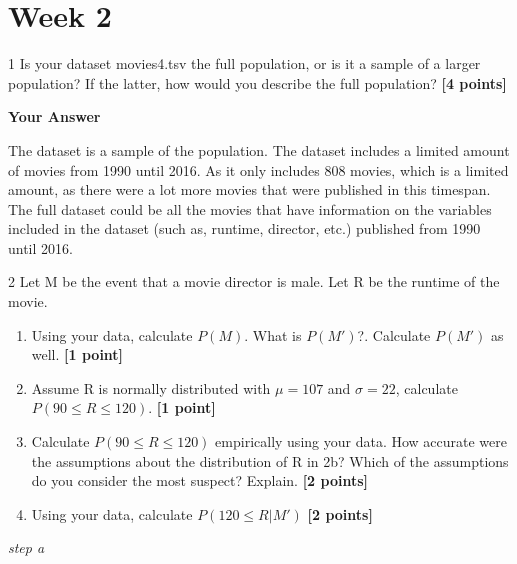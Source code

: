 \documentclass[
]{article}
\newenvironment{Shaded}{\begin{snugshade}}{\end{snugshade}}
\newcommand{\DecValTok}[1]{\textcolor[rgb]{0.00,0.00,0.81}{#1}}
\newcommand{\FunctionTok}[1]{\textcolor[rgb]{0.13,0.29,0.53}{\textbf{#1}}}
\newcommand{\NormalTok}[1]{#1}
\newcommand{\OtherTok}[1]{\textcolor[rgb]{0.56,0.35,0.01}{#1}}
\newcommand{\SpecialCharTok}[1]{\textcolor[rgb]{0.81,0.36,0.00}{\textbf{#1}}}
\newcommand{\StringTok}[1]{\textcolor[rgb]{0.31,0.60,0.02}{#1}}
\providecommand{\tightlist}{%
  \setlength{\itemsep}{0pt}\setlength{\parskip}{0pt}}
\begin{document}
\section{Week 2}\label{week-2}

1 Is your dataset movies4.tsv the full population, or is it a sample of
a larger population? If the latter, how would you describe the full
population? \textbf{[4 points]}

\textbf{Your Answer}

The dataset is a sample of the population. The dataset includes a
limited amount of movies from 1990 until 2016. As it only includes 808
movies, which is a limited amount, as there were a lot more movies that
were published in this timespan. The full dataset could be all the
movies that have information on the variables included in the dataset
(such as, runtime, director, etc.) published from 1990 until 2016.

2 Let M be the event that a movie director is male. Let R be the runtime
of the movie.

\begin{enumerate}
\def\labelenumi{\alph{enumi}.}
\tightlist
\item
  Using your data, calculate \(P(M)\). What is \(P(M')\)?. Calculate
  \(P(M')\) as well. \textbf{[1 point]}
\item
  Assume R is normally distributed with \(\mu=107\) and \(\sigma=22\),
  calculate \(P(90 \leq R \leq 120)\). \textbf{[1 point]}
\item
  Calculate \(P(90 \leq R \leq 120)\) empirically using your data. How
  accurate were the assumptions about the distribution of R in 2b? Which
  of the assumptions do you consider the most suspect? Explain.
  \textbf{[2 points]}
\item
  Using your data, calculate \(P(120 \leq R | M')\) \textbf{[2 points]}
\end{enumerate}

\emph{step a}

\begin{Shaded}
\end{Shaded}
\end{document}
